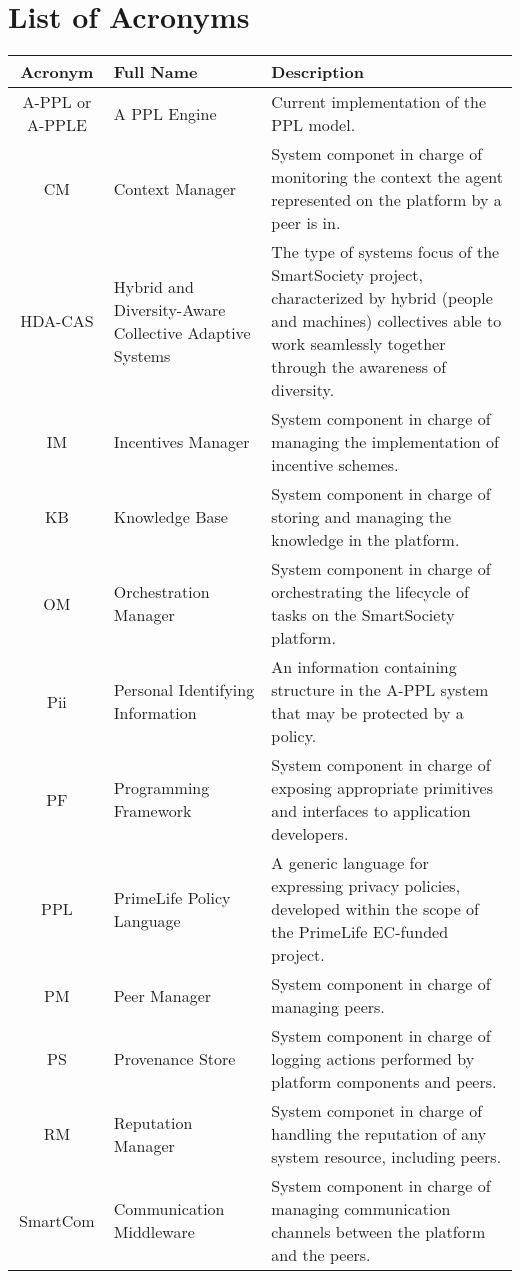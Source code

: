 \documentclass{SmartReport}
\begin{document}
\section*{List of Acronyms}
\begin{tabular}{|c|p{3cm}|p{10cm}|}
\hline 
\textbf{Acronym} & \textbf{Full Name} & \textbf{Description} \\
\hline 
\hline 
A-PPL or A-PPLE & A PPL Engine & Current implementation of the PPL model.\\
\hline
CM & Context Manager & System componet in charge of monitoring the
context the agent represented on the platform by a peer is in.\\
\hline
HDA-CAS & Hybrid and Diversity-Aware Collective Adaptive Systems & The
type of systems focus of the SmartSociety project, characterized by
hybrid (people and machines) collectives able to work seamlessly
together through the awareness of diversity. \\ 
\hline
IM & Incentives Manager & System component in charge of managing the implementation of incentive schemes.\\  
\hline 
KB & Knowledge Base &  System component in charge of storing and managing the knowledge in the platform.\\
\hline
OM & Orchestration Manager &  System component in charge of orchestrating the lifecycle of tasks on the SmartSociety platform. \\
\hline 
Pii & Personal Identifying Information & An information containing structure in the A-PPL system that may be protected by a policy. \\
\hline
PF & Programming Framework &  System component in charge of exposing
appropriate primitives and interfaces to application developers.\\
\hline
PPL & PrimeLife Policy Language & A generic language for expressing
privacy policies, developed within the scope of the PrimeLife
EC-funded project. \\
\hline 
PM & Peer Manager &  System component in charge of managing peers.\\
\hline 
PS & Provenance Store & System component in charge of logging actions performed by platform components and peers.\\
\hline
RM & Reputation Manager & System componet in charge of handling the reputation of any system resource, including peers. \\
\hline
SmartCom & Communication Middleware & System component in charge of managing
communication channels between the platform and the peers. \\
\hline
\end{tabular}
\end{document}
